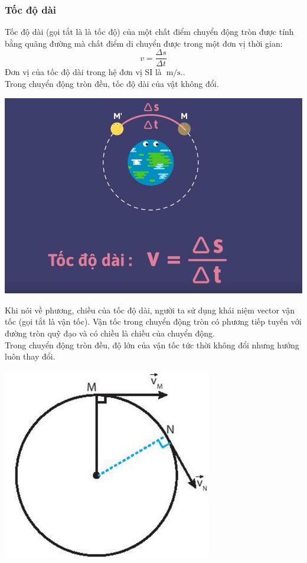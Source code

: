 \subsubsection{Tốc độ dài}
Tốc độ dài (gọi tắt là là tốc độ) của một chất điểm chuyển động tròn được tính bằng quãng đường mà chất điểm di chuyển được trong một đơn vị thời gian:
$$v=\frac{\Delta s}{\Delta t} $$
Đơn vị của tốc độ dài trong hệ đơn vị SI là $\SI{}{\meter/\second.}$.\\
Trong chuyển động tròn đều, tốc độ dài của vật không đổi. \\
\begin{center}
	\includegraphics[scale=0.3]{../figs/VN10-PH-06-L-005-2-V2-01.jpg}
\end{center}	
\begin{minipage}{0.6\textwidth}
	Khi nói về phương, chiều của tốc độ dài, người ta sử dụng khái niệm vector vận tốc (gọi tắt là vận tốc). Vận tốc trong chuyển động tròn có phương tiếp tuyến với đường tròn quỹ đạo và có chiều là chiều của chuyển động.\\
	Trong chuyển động tròn đều, độ lớn của vận tốc tức thời không đổi nhưng hướng luôn thay đổi.
\end{minipage}
\begin{minipage}{0.4\textwidth}
	\begin{center}
		\includegraphics[scale=0.6]{../figs/G10-026-2}
	\end{center}
\end{minipage}
